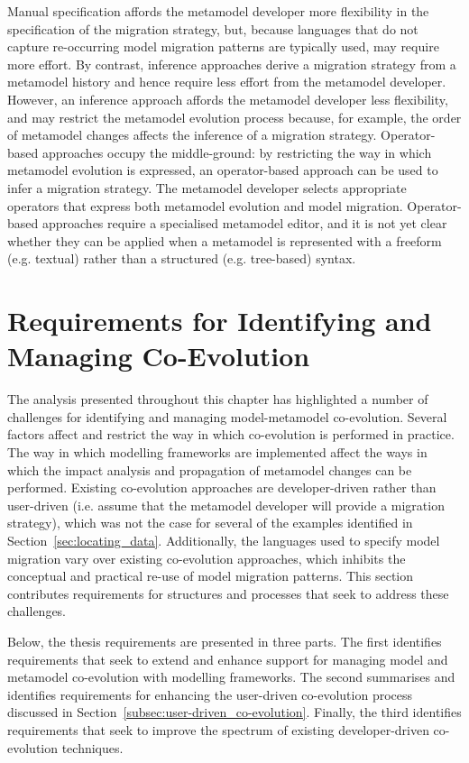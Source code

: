 Manual specification affords the metamodel developer more flexibility in the specification of the migration strategy, but, because languages that do not capture re-occurring model migration patterns are typically used, may require more effort. By contrast, inference approaches derive a migration strategy from a metamodel history and hence require less effort from the metamodel developer. However, an inference approach affords the metamodel developer less flexibility, and may restrict the metamodel evolution process because, for example, the order of metamodel changes affects the inference of a migration strategy. Operator-based approaches occupy the middle-ground: by restricting the way in which metamodel evolution is expressed, an operator-based approach can be used to infer a migration strategy. The metamodel developer selects appropriate operators that express both metamodel evolution and model migration. Operator-based approaches require a specialised metamodel editor, and it is not yet clear whether they can be applied when a metamodel is represented with a freeform (e.g. textual) rather than a structured (e.g. tree-based) syntax.


\section[Requirements for Identifying and Managing Co-Evolution][Requirements for Co-Evolution]{Requirements for Identifying and Managing Co-Evolution}
\label{sec:requirements_identification}

The analysis presented throughout this chapter has highlighted a number of challenges for identifying and managing model-metamodel co-evolution. Several factors affect and restrict the way in which co-evolution is performed in practice. The way in which modelling frameworks are implemented affect the ways in which the impact analysis and propagation of metamodel changes can be performed. Existing co-evolution approaches are developer-driven rather than user-driven (i.e. assume that the metamodel developer will provide a migration strategy), which was not the case for several of the examples identified in Section~\ref{sec:locating_data}. Additionally, the languages used to specify model migration vary over existing co-evolution approaches, which inhibits the conceptual and practical re-use of model migration patterns. This section contributes requirements for structures and processes that seek to address these challenges.

Below, the thesis requirements are presented in three parts. The first identifies requirements that seek to extend and enhance support for managing model and metamodel co-evolution with modelling frameworks. The second summarises and identifies requirements for enhancing the user-driven co-evolution process discussed in Section~\ref{subsec:user-driven_co-evolution}. Finally, the third identifies requirements that seek to improve the spectrum of existing developer-driven co-evolution techniques.



